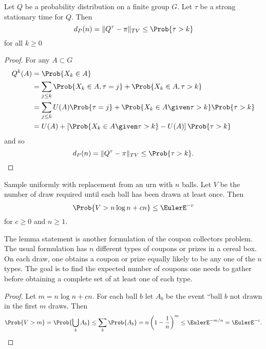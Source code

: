 \documentclass[12pt]{article}
\begin{document}
\begin{lemma}
    \label{lem:cardshuffling:stoptime} Let \( Q \) be a probability
    distribution on a finite group \( G \).  Let \( \tau \) be a strong
    stationary time for \( Q \).  Then
    \[
        d_P(n) = \| Q^{\tau} - \pi \|_{TV} \le \Prob{\tau > k}
    \] for all \( k \ge 0 \)
\end{lemma}

\begin{proof}
    For any \( A \subset G \)
    \begin{align*}
        Q^{k}(A) &= \Prob{X_k \in A} \\
        &= \sum_{j \le k} \Prob{X_k \in A, \tau = j} + \Prob{X_k \in A,
        \tau >k} \\
        &= \sum_{j \le k} U(A) \Prob{\tau = j} + \Prob{X_k \in A \given
        \tau >k} \Prob{\tau > k} \\
        &= U(A) + \left[ \Prob{X_k \in A \given \tau >k} - U(A) \right]
        \Prob{\tau > k}
    \end{align*}
    and so
    \[
        d_P(n) = \| Q^{\tau} - \pi \|_{TV} \le \Prob{\tau > k}.
    \]
\end{proof}

\begin{lemma}
    \label{lem:cardshuffling:coupon} Sample uniformly with replacement
    from an urn with \( n \) balls.  Let \( V \) be the number of draw
    required until each ball has been drawn at least once.  Then
    \[
        \Prob{V > n \log n + c n} \le \EulerE^{-c}
    \] for \( c \ge 0 \) and \( n \ge 1 \).
\end{lemma}

\begin{remark}
    The lemma statement is another formulation of the coupon collectors
    problem.%
    The usual formulation has \( n \) different types of coupons or
    prizes in a cereal box.  On each draw, one obtains a coupon or prize
    equally likely to be any one of the \( n \) types.  The goal is to
    find the expected number of coupons one needs to gather before
    obtaining a complete set of at least one of each type.
\end{remark}

\begin{proof}
    Let \( m = n \log n + c n \).  For each ball \( b \) let \( A_b \)
    be the event ``ball \( b \) not drawn in the first \( m \) draws.
    Then
    \[
        \Prob{ V > m} = \Prob{ \bigcup_b A_b } \le \sum_{b} \Prob{A_b} =
        n \left( 1 - \frac{1}{n} \right)^m \le \EulerE^{-m/n} = \EulerE^
        {-c}.
    \]
\end{proof}
\end{document}
